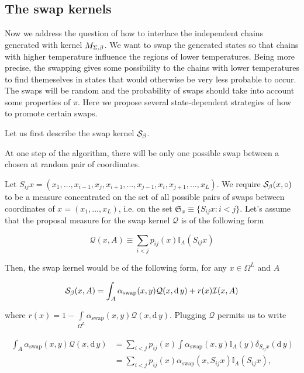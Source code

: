 	\subsection*{The swap kernels}

Now we address the question of how to interlace the independent chains generated with kernel $M_{\Sigma,\beta}$. We want to swap the generated states so that chains with higher temperature influence the regions of lower temperatures. Being more precise, the swapping gives some possibility to the chains with lower temperatures to find themeselves in states that would otherwise be very less probable to occur. The swaps will be random and the probability of swaps should take into account some properties of $\pi$. Here we propose several state-dependent strategies of how to promote certain swaps.

Let us first describe the swap kernel $\mathcal{S}_{\beta}$. 

\begin{assumptions}[resume]
	\item At one step of the algorithm, there will be only one possible swap between a chosen at random pair of coordinates.
\end{assumptions}

Let $S_{ij} x = (x_1, \dots, x_{i-1}, x_j, x_{i+1}, \dots, x_{j-1}, x_i, x_{j+1}, \dots, x_L)$. We require $\mathcal{S}_{\beta}(x, \circ )$ to be a measure concentrated on the set of all possible pairs of swaps between coordinates of $x = (x_1, \dots, x_L)$, i.e. on the set $\mathfrak{S}_x \equiv \{ S_{ij}x : i < j  \}$. Let's assume that the proposal measure for the swap kernel $\mathcal{Q}$ is of the following form 

\begin{equation*}
	\mathcal{Q}(x, A) \equiv \underset{i < j}{\sum} p_{ij}(x) \mathbb{I}_A (S_{ij} x)
\end{equation*}	 

Then, the swap kernel would be of the following form, for any $x \in \Omega^L$ and $A$

\begin{equation*}
	\mathcal{S}_{\beta}(x,A) = \int_{A} \alpha_\text{swap} (x,y) \mathcal{Q}(x, \mathrm{d}\,y) + r(x) \mathcal{I}(x,A)
\end{equation*}	

where $r(x) = 1 - \underset{\Omega^L}{\int} \alpha_\text{swap} (x,y) \mathcal{Q}(x, \mathrm{d}\,y) $. Plugging $\mathcal{Q}$ permits us to write

\begin{align*}
	\begin{split}
		\int_{A} \alpha_\text{swap} (x,y) \mathcal{Q}(x, \mathrm{d}\,y) &= \underset{ i < j}{\sum} p_{ij}(x) \int \alpha_\text{swap} (x,y) \mathbb{I}_A (y) \delta_{S_{ij}x}(\mathrm{d}\, y) \\ &= \underset{ i < j}{\sum} p_{ij}(x) \alpha_\text{swap} (x, S_{ij}x) \mathbb{I}_A(S_{ij} x),
	\end{split}
\end{align*}	


